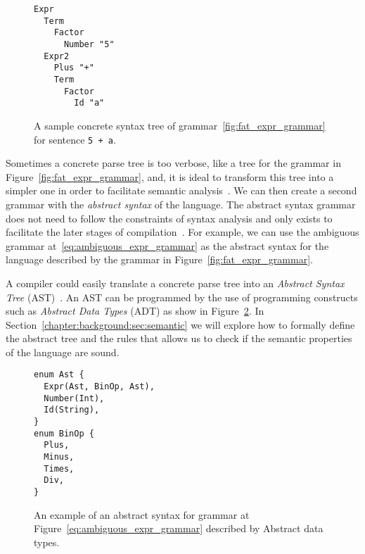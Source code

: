 \documentclass[
  oneside,
  english,
  coorientadorbanca,
  embeddedlogo,
  noabntexcite
]{ufsc-thesis-rn46-2019}
\newcommand{\code}[1]{\texttt{#1}}
\begin{document}
\begin{figure}[ht]
  \centering
  \begin{minipage}{0.5\textwidth}
    \begin{verbatim}
Expr
  Term
    Factor
      Number "5"
  Expr2
    Plus "+"
    Term
      Factor
        Id "a"
    \end{verbatim}
  \end{minipage}
  \caption{
    A sample concrete syntax tree of grammar~\ref{fig:fat_expr_grammar} for sentence \code{5 + a}.
  }\label{fig:concrete_syntax_tree}
\end{figure}

Sometimes a concrete parse tree is too verbose, like a tree for the grammar in Figure~\ref{fig:fat_expr_grammar}, and, it is ideal to transform this tree into a simpler one in order to facilitate semantic analysis~\cite{appel2003modern}.
We can then create a second grammar with the \textit{abstract syntax} of the language.
The abstract syntax grammar does not need to follow the constraints of syntax analysis and only exists to facilitate the later stages of compilation~\cite{appel2003modern}.
For example, we can use the ambiguous grammar at~\eqref{eq:ambiguous_expr_grammar} as the abstract syntax for the language described by the grammar in Figure~\ref{fig:fat_expr_grammar}.

A compiler could easily translate a concrete parse tree into an \textit{Abstract Syntax Tree} (AST)~\cite{appel2003modern}.
An AST can be programmed by the use of programming constructs such as \textit{Abstract Data Types} (ADT) as show in Figure~\ref{fig:abstract_syntax_adt}.
In Section~\ref{chapter:background:sec:semantic} we will explore how to formally define the abstract tree and the rules that allows us to check if the semantic properties of the language are sound.

\begin{figure}[ht]
  \centering
  \begin{minipage}{0.6\textwidth}
    \begin{verbatim}
enum Ast {
  Expr(Ast, BinOp, Ast),
  Number(Int),
  Id(String),
}
enum BinOp {
  Plus,
  Minus,
  Times,
  Div,
}
    \end{verbatim}
  \end{minipage}
  \caption{
    An example of an abstract syntax for grammar at Figure~\eqref{eq:ambiguous_expr_grammar} described by Abstract data types.
  }\label{fig:abstract_syntax_adt}
\end{figure}
\end{document}
